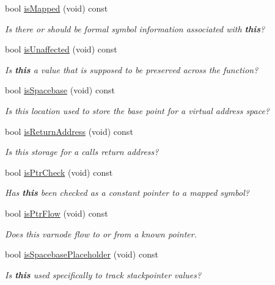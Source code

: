 \begin{DoxyCompactItemize}
bool \mbox{\hyperlink{class_varnode_a4c53a54e074c85e38f38eb3c2c3ae13d}{is\+Mapped}} (void) const
\begin{DoxyCompactList}\small\item\em Is there or should be formal symbol information associated with {\bfseries{this}}? \end{DoxyCompactList}\item 
bool \mbox{\hyperlink{class_varnode_a68b1c26ef731500527e78b78da049bcb}{is\+Unaffected}} (void) const
\begin{DoxyCompactList}\small\item\em Is {\bfseries{this}} a value that is supposed to be preserved across the function? \end{DoxyCompactList}\item 
bool \mbox{\hyperlink{class_varnode_acd05a4490f361d118129cc0490072420}{is\+Spacebase}} (void) const
\begin{DoxyCompactList}\small\item\em Is this location used to store the base point for a virtual address space? \end{DoxyCompactList}\item 
bool \mbox{\hyperlink{class_varnode_a7980ae27d26fa407b8332ef967d24b84}{is\+Return\+Address}} (void) const
\begin{DoxyCompactList}\small\item\em Is this storage for a calls return address? \end{DoxyCompactList}\item 
bool \mbox{\hyperlink{class_varnode_ae66b877df6f8f3dd79630a1ce2236997}{is\+Ptr\+Check}} (void) const
\begin{DoxyCompactList}\small\item\em Has {\bfseries{this}} been checked as a constant pointer to a mapped symbol? \end{DoxyCompactList}\item 
bool \mbox{\hyperlink{class_varnode_abd10110ad081fb74cdce9eb1b9ddd28d}{is\+Ptr\+Flow}} (void) const
\begin{DoxyCompactList}\small\item\em Does this varnode flow to or from a known pointer. \end{DoxyCompactList}\item 
bool \mbox{\hyperlink{class_varnode_a5af59f76912f944a4e20842d3c2bf2e0}{is\+Spacebase\+Placeholder}} (void) const
\begin{DoxyCompactList}\small\item\em Is {\bfseries{this}} used specifically to track stackpointer values? \end{DoxyCompactList}\item 

\end{DoxyCompactItemize}
